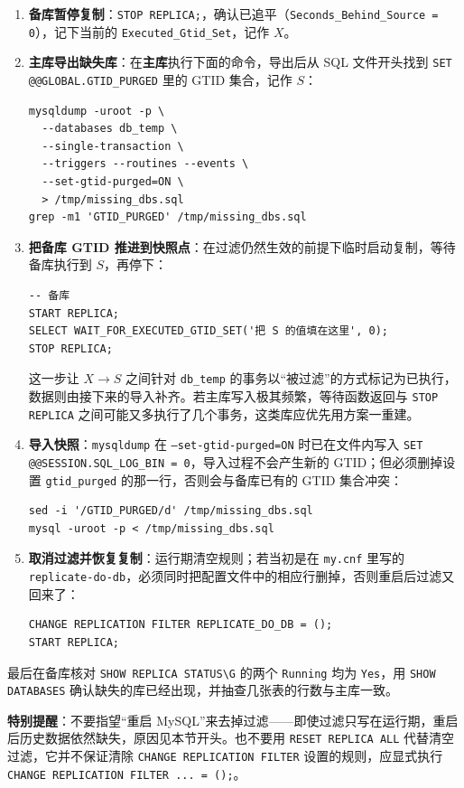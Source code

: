 \documentclass[12pt,UTF8]{ctexbook}
\begin{document}
\begin{enumerate}[leftmargin=2cm]
  \item \textbf{备库暂停复制}：\texttt{STOP REPLICA;}，确认已追平（\texttt{Seconds\_Behind\_Source = 0}），记下当前的 \texttt{Executed\_Gtid\_Set}，记作 $X$。
  \item \textbf{主库导出缺失库}：在\textbf{主库}执行下面的命令，导出后从 SQL 文件开头找到 \texttt{SET @@GLOBAL.GTID\_PURGED} 里的 GTID 集合，记作 $S$：
\begin{lstlisting}
mysqldump -uroot -p \
  --databases db_temp \
  --single-transaction \
  --triggers --routines --events \
  --set-gtid-purged=ON \
  > /tmp/missing_dbs.sql
grep -m1 'GTID_PURGED' /tmp/missing_dbs.sql
\end{lstlisting}
  \item \textbf{把备库 GTID 推进到快照点}：在过滤仍然生效的前提下临时启动复制，等待备库执行到 $S$，再停下：
\begin{lstlisting}
-- 备库
START REPLICA;
SELECT WAIT_FOR_EXECUTED_GTID_SET('把 S 的值填在这里', 0);
STOP REPLICA;
\end{lstlisting}
这一步让 $X \to S$ 之间针对 \texttt{db\_temp} 的事务以“被过滤”的方式标记为已执行，数据则由接下来的导入补齐。若主库写入极其频繁，等待函数返回与 \texttt{STOP REPLICA} 之间可能又多执行了几个事务，这类库应优先用方案一重建。
  \item \textbf{导入快照}：\texttt{mysqldump} 在 \texttt{--set-gtid-purged=ON} 时已在文件内写入 \texttt{SET @@SESSION.SQL\_LOG\_BIN = 0}，导入过程不会产生新的 GTID；但必须删掉设置 \texttt{gtid\_purged} 的那一行，否则会与备库已有的 GTID 集合冲突：
\begin{lstlisting}
sed -i '/GTID_PURGED/d' /tmp/missing_dbs.sql
mysql -uroot -p < /tmp/missing_dbs.sql
\end{lstlisting}
  \item \textbf{取消过滤并恢复复制}：运行期清空规则；若当初是在 \texttt{my.cnf} 里写的 \texttt{replicate-do-db}，必须同时把配置文件中的相应行删掉，否则重启后过滤又回来了：
\begin{lstlisting}
CHANGE REPLICATION FILTER REPLICATE_DO_DB = ();
START REPLICA;
\end{lstlisting}
\end{enumerate}

最后在备库核对 \verb|SHOW REPLICA STATUS\G| 的两个 \texttt{Running} 均为 \texttt{Yes}，用 \texttt{SHOW DATABASES} 确认缺失的库已经出现，并抽查几张表的行数与主库一致。

\textbf{特别提醒}：不要指望“重启 MySQL”来去掉过滤——即使过滤只写在运行期，重启后历史数据依然缺失，原因见本节开头。也不要用 \texttt{RESET REPLICA ALL} 代替清空过滤，它并不保证清除 \texttt{CHANGE REPLICATION FILTER} 设置的规则，应显式执行 \texttt{CHANGE REPLICATION FILTER ... = ();}。
\end{document}
